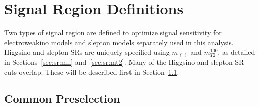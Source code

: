 \section{Signal Region Definitions}
\label{sec:sr:srdef}
 Two types of signal region are defined to optimize signal sensitivity for electroweakino models and slepton models separately used in this analysis. Higgsino and slepton SRs are uniquely specified using $m_{\ell\ell}$ and $m^{100}_{T2}$, as detailed in Sections~\ref{sec:sr:mll} and~\ref{sec:sr:mt2}.  Many of the Higgsino and slepton SR cuts overlap.  These will be described first in Section~\ref{sec:sr:commom}.

\subsection{Common Preselection}
\label{sec:sr:commom}

